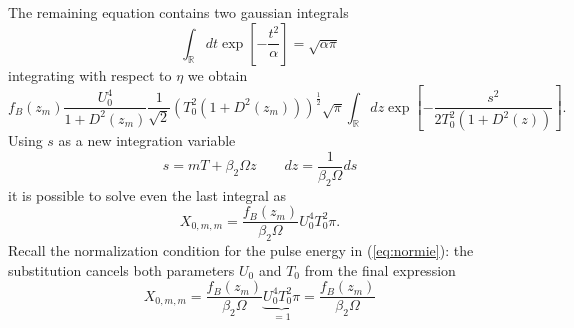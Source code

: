 \documentclass[10pt, lettersize, journal, onecolumn]{IEEEtran}
\begin{document}
The remaining equation contains two gaussian integrals
\begin{equation}
	\int_{\mathbb{R}}dt \exp\left[-\dfrac{t^2}{\alpha}\right] = \sqrt{\alpha \pi} 
\end{equation}
integrating with respect to $\eta$ we obtain
\begin{equation}
	f_B(z_m) \dfrac{U_0^4}{1+D^2(z_m)}  \dfrac{1}{\sqrt{2}} (T_0^2(1+D^2(z_m)))^{\frac{1}{2}}\sqrt{\pi} \int_{\mathbb{R}}dz   \exp\left[-\dfrac{s^2}{2T_0^2(1+D^2(z))} \right].
\end{equation}
Using $s$ as a new integration variable
\begin{equation}
	s = mT+\beta_2\Omega z  \qquad dz = \dfrac{1}{\beta_2\Omega}ds
\end{equation}
it is possible to solve even the last integral as
\begin{equation}
	X_{0, m, m} = \dfrac{f_B(z_m)}{\beta_2 \Omega} U_0^4 T_0^2 \pi.
\end{equation}
Recall the normalization condition for the pulse energy in (\ref{eq:normie}): the substitution cancels both parameters $U_0$ and $T_0$ from the final expression
\begin{equation}\label{eq:solution_2}
	X_{0, m, m} = \dfrac{f_B(z_m)}{\beta_2 \Omega} \underbrace{U_0^4 T_0^2 \pi}_{=1} = \dfrac{f_B(z_m)}{\beta_2 \Omega}
\end{equation}
\end{document}

